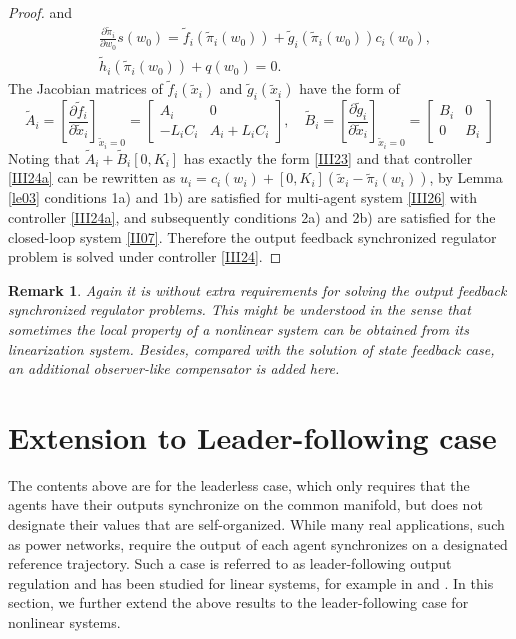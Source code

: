\documentclass[onecolumn,a4paper,12pt]{article}
\newtheorem{remark}{Remark}
\numberwithin{equation}{section}
\begin{document}
\begin{proof}
and
\begin{equation} \label{III27}
\begin{split}
 &\frac{\partial \tilde{\pi}_i}{\partial w_0} s(w_0) = \tilde{f}_i(\tilde{\pi}_i(w_0))+\tilde{g}_i(\tilde{\pi}_i(w_0))c_i(w_0), \\
&\tilde{h}_i(\tilde{\pi}_i(w_0))+q(w_0)=0.
\end{split}
\end{equation}
The Jacobian matrices of $\tilde{f}_i(\tilde{x}_i)$ and $\tilde{g}_i(\tilde{x}_i)$ have the form of
\begin{equation}
  \tilde{A}_i=\left[
  \frac{\partial \tilde{f}_i}{\partial \tilde{x}_i}
  \right]_{\tilde{x}_i=0}=\begin{bmatrix}
    A_i & 0 \\
    -L_iC_i & A_i+L_iC_i
  \end{bmatrix}, \quad \tilde{B}_i=\left[
  \frac{\partial \tilde{g}_i}{\partial \tilde{x}_i}
  \right]_{\tilde{x}_i=0}=\begin{bmatrix}
    B_i & 0 \\
    0 & B_i
  \end{bmatrix}
\end{equation}
Noting that $\tilde{A}_i+\tilde{B}_i[0, K_i]$ has exactly the form \eqref{III23} and that controller \eqref{III24a} can be rewritten as $u_i=c_i(w_i)+[0, K_i](\tilde{x}_i-\tilde{\pi}_i(w_i))$, by Lemma \ref{le03} conditions 1a) and 1b) are satisfied for multi-agent system \eqref{III26} with controller \eqref{III24a}, and subsequently conditions 2a) and 2b) are satisfied for the closed-loop system \eqref{II07}. Therefore the output feedback synchronized regulator problem is solved under controller \eqref{III24}.
\end{proof}

\begin{remark}
Again it is without extra requirements for solving the output feedback synchronized regulator problems. This might be understood in the sense that sometimes the local property of a nonlinear system can be obtained from its linearization system. Besides, compared with the solution of state feedback case, an additional observer-like compensator is added here.
\end{remark}

\section{Extension to Leader-following case} \label{sec04}
The contents above are for the leaderless case, which only requires that the agents have their outputs synchronize on the common manifold, but does not designate their values that are self-organized. While many real applications, such as power networks, require the output of each agent synchronizes on a designated reference trajectory. Such a case is referred to as leader-following output regulation and has been studied for linear systems, for example in \cite{XiangTAC2009} \cite{WangTAC2010} and \cite{SuTAC2012}. In this section, we further extend the above results to the leader-following case for nonlinear systems.
\end{document}
